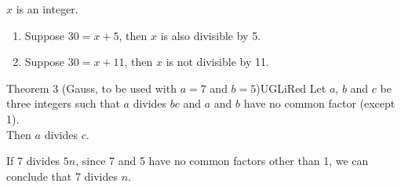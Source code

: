 \documentclass[12pt,a4paper,eval,english,firamath]{nsi}
\begin{document}
\begin{exemple}[]
    $x$ is an integer.
    \begin{enumerate}
        \item Suppose $30 = x + 5$, then $x$ is also divisible by 5.
        \item Suppose $30 = x + 11$, then $x$ is not divisible by 11.
    \end{enumerate}
\end{exemple}


\begin{encadrecolore}{Theorem 3 (Gauss, to be used with $a=7$ and $b=5$)}{UGLiRed}
    Let $a$, $b$ and $c$ be three integers such that $a$ divides $bc$ and $a$ and $b$ have no common factor (except 1).\\

    Then $a$ divides $c$.
\end{encadrecolore}

\begin{exemple}[]
    If 7 divides $5n$, since 7 and 5 have no common factors other than 1, we can conclude that 7 divides $n$.
\end{exemple}
\end{document}
